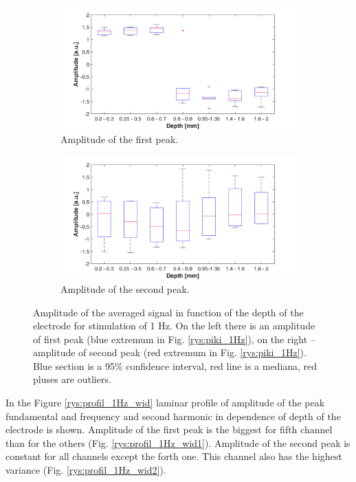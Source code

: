 \documentclass{pracalicmgr}
\begin{document}
\begin{figure}[H]
	\begin{subfigure}{.5\textwidth}
		\centering
		\includegraphics[width=1.\linewidth]{profile_1Hz_amp.png}
		\caption{Amplitude of the first peak.}
		\label{rys:profil_1Hz_amp1}
	\end{subfigure}%
	\begin{subfigure}{.5\textwidth}
		\centering
		\includegraphics[width=1.\linewidth]{profile_1Hz_amp2.png}
		\caption{Amplitude of the second peak.}
		\label{rys:profil_1Hz_amp2}
	\end{subfigure}
	
	\caption{Amplitude of the averaged signal in function of the depth of the electrode for stimulation of 1 Hz. On the left there is an amplitude of first peak  (blue extremum in Fig. \ref{rys:piki_1Hz}), on the right -- amplitude of second peak (red extremum in Fig. \ref{rys:piki_1Hz}). Blue section is a 95\% confidence interval, red line is a mediana, red pluses are outliers.}
	\label{rys:profil_1Hz_amp}
\end{figure}

In the Figure \ref{rys:profil_1Hz_wid} laminar profile of amplitude of the peak fundamental and frequency and second harmonic in dependence of depth of the electrode is shown. Amplitude of the first peak is the biggest for fifth channel than for the others (Fig. \ref{rys:profil_1Hz_wid1}). Amplitude of the second peak is constant for all channels except the forth one. This channel also has the highest variance (Fig. \ref{rys:profil_1Hz_wid2}).
\end{document}
